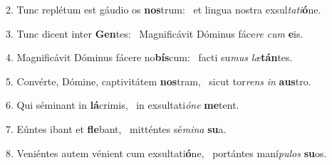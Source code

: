 2. Tunc replétum est gáudio os \textbf{nos}trum: \ast\  et lingua nostra exsul\textit{ta}\textit{ti}\textbf{ó}ne.\

3. Tunc dicent inter \textbf{Gen}tes: \ast\  Magnificávit Dóminus fáce\textit{re} \textit{cum} \textbf{e}is.\

4. Magnificávit Dóminus fácere no\textbf{bís}cum: \ast\  facti su\textit{mus} \textit{læ}\textbf{tán}tes.\

5. Convérte, Dómine, captivitátem \textbf{nos}tram, \ast\  sicut tor\textit{rens} \textit{in} \textbf{aus}tro.\

6. Qui séminant in \textbf{lá}crimis, \ast\  in exsultati\textit{ó}\textit{ne} \textbf{me}tent.\

7. Eúntes ibant et \textbf{fle}bant, \ast\  mitténtes sé\textit{mi}\textit{na} \textbf{su}a.\

8. Veniéntes autem vénient cum exsultati\textbf{ó}ne, \ast\  portántes maní\textit{pu}\textit{los} \textbf{su}os.\

